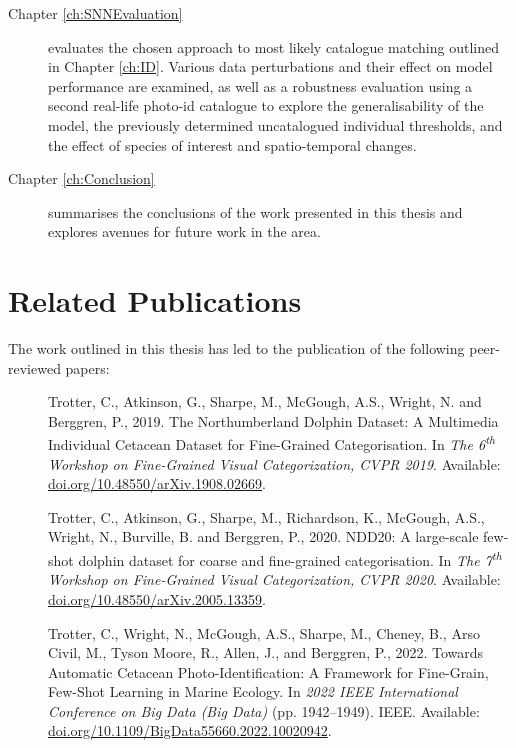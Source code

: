 \begin{description}
	\item[Chapter \ref{ch:SNNEvaluation}] evaluates the chosen approach to most likely catalogue matching outlined in Chapter \ref{ch:ID}. Various data perturbations and their effect on model performance are examined, as well as a robustness evaluation using a second real-life photo-id catalogue to explore the generalisability of the model, the previously determined uncatalogued individual thresholds, and the effect of species of interest and spatio-temporal changes.
	
	\item[Chapter \ref{ch:Conclusion}] summarises the conclusions of the work presented in this thesis and explores avenues for future work in the area.  
	 
\end{description}

\section{Related Publications}\label{ch:intro,relatedPublications}

The work outlined in this thesis has led to the publication of the following peer-reviewed papers:

\begin{description}
	
	\item[\cite{trotter_northumberland_2019}] Trotter, C., Atkinson, G., Sharpe, M., McGough, A.S., Wright, N. and Berggren, P., 2019. The Northumberland Dolphin Dataset: A Multimedia Individual Cetacean Dataset for Fine-Grained Categorisation. In \textit{The 6\textsuperscript{th} Workshop on Fine-Grained Visual Categorization, CVPR 2019}. Available: \href{https://doi.org/10.48550/arXiv.1908.02669}{doi.org/10.48550/arXiv.1908.02669}.
	
	\item[\cite{trotter_ndd20_2020}] Trotter, C., Atkinson, G., Sharpe, M., Richardson, K., McGough, A.S., Wright, N., Burville, B. and Berggren, P., 2020. NDD20: A large-scale few-shot dolphin dataset for coarse and fine-grained categorisation. In \textit{The 7\textsuperscript{th} Workshop on Fine-Grained Visual Categorization, CVPR 2020}. Available: \href{https://doi.org/10.48550/arXiv.2005.13359}{doi.org/10.48550/arXiv.2005.13359}. 
	
	\item [\cite{trotter_towards_2022}] Trotter, C., Wright, N., McGough, A.S., Sharpe, M., Cheney, B., Arso Civil, M., Tyson Moore, R., Allen, J., and Berggren, P., 2022. Towards Automatic Cetacean Photo-Identification: A Framework for Fine-Grain, Few-Shot Learning in Marine Ecology. In \textit{2022 IEEE International Conference on Big Data (Big Data)} (pp. 1942--1949). IEEE.  Available: \href{https://doi.org/10.1109/BigData55660.2022.10020942}{doi.org/10.1109/BigData55660.2022.10020942}.
\end{description}

